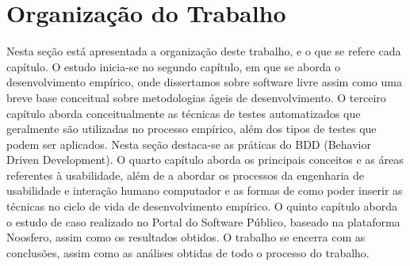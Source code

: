 \section{Organização do Trabalho}


Nesta seção está apresentada a organização deste trabalho, e o que se refere cada capítulo.
%
O estudo inicia-se no segundo capítulo, em que se aborda o desenvolvimento empírico, onde dissertamos sobre software livre assim como uma breve base conceitual sobre metodologias ágeis de desenvolvimento.
%
O terceiro capítulo aborda conceitualmente as técnicas de testes automatizados que geralmente são utilizadas no processo empírico, além dos tipos de testes que podem ser aplicados. Nesta seção destaca-se as práticas do BDD (Behavior Driven Development).
%
O quarto capítulo aborda os principais conceitos e as áreas referentes à usabilidade, além de a abordar os processos da engenharia de usabilidade e interação humano computador e as formas de como poder inserir as técnicas no ciclo de vida de desenvolvimento empírico.
%
O quinto capítulo aborda o estudo de caso realizado no Portal do Software Público, baseado na plataforma Noosfero, assim como os resultados obtidos.
%
O trabalho se encerra com as conclusões, assim como as análises obtidas de todo o processo do trabalho.



